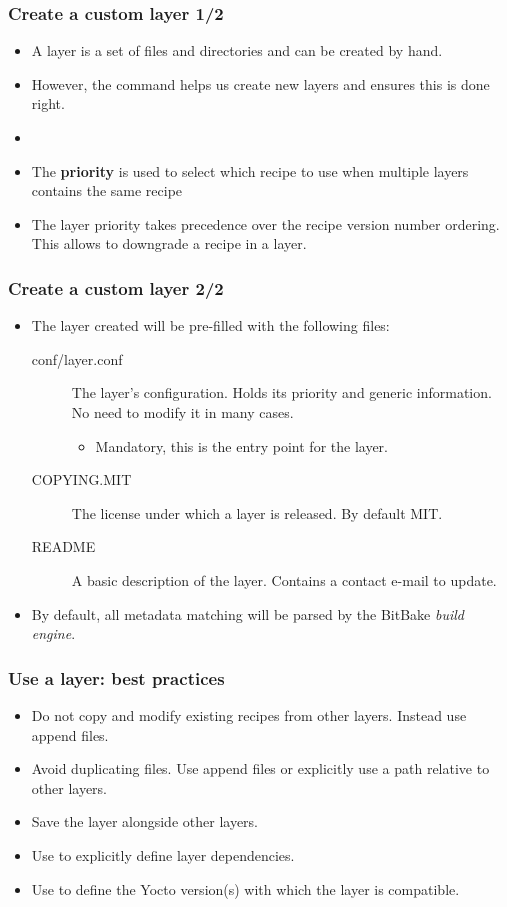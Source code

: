 \begin{frame}
  \frametitle{Create a custom layer 1/2}
  \begin{itemize}
    \item A layer is a set of files and directories and can be created
      by hand.
    \item However, the  command helps us create new
      layers and ensures this is done right.
    \item {}
    \item The \textbf{priority} is used to select which recipe to use when multiple layers contains the same recipe
    \item The layer priority takes precedence over the recipe version
          number ordering. This allows to downgrade a recipe in a layer.
  \end{itemize}
\end{frame}

\begin{frame}
  \frametitle{Create a custom layer 2/2}
  \begin{itemize}
    \item The layer created will be pre-filled with the following
          files:
    \begin{description}
      \item[conf/layer.conf] The layer's configuration. Holds its
        priority and generic information. No need to modify it in many
        cases.
        \begin{itemize}
          \item Mandatory, this is the entry point for the layer.
        \end{itemize}
      \item[COPYING.MIT] The license under which a layer is released.
        By default MIT.
      \item[README] A basic description of the layer. Contains a
        contact e-mail to update.
    \end{description}
    \item By default, all metadata matching 
          will be parsed by the BitBake \emph{build engine}.
  \end{itemize}
\end{frame}

\begin{frame}
  \frametitle{Use a layer: best practices}
  \begin{itemize}
    \item Do not copy and modify existing recipes from other layers.
      Instead use append files.
    \item Avoid duplicating files. Use append files or explicitly use
      a path relative to other layers.
    \item Save the layer alongside other layers.
    \item Use  to explicitly define layer
      dependencies.
    \item Use  to define the Yocto version(s)
    with which the layer is compatible.
  \end{itemize}
\end{frame}
